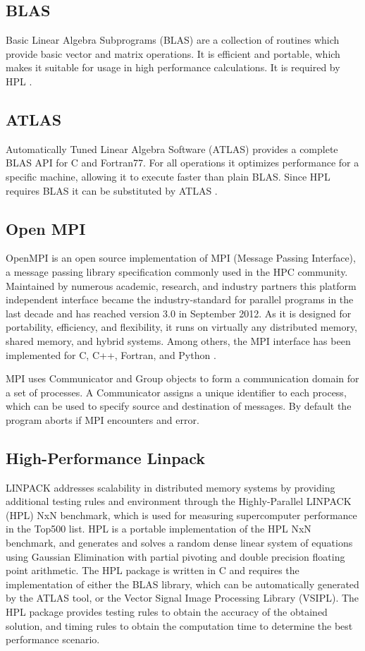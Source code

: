 \documentclass[10pt,twocolumn]{article}
\begin{document}
\subsection{BLAS}
Basic Linear Algebra Subprograms (BLAS) are a collection of routines which provide basic vector and matrix operations. It is efficient and portable, which makes it suitable for usage in high performance calculations. It is required by HPL \cite{blas}.

\subsection{ATLAS}
Automatically Tuned Linear Algebra Software (ATLAS) provides a complete BLAS API for C and Fortran77. For all operations it optimizes performance for a specific machine, allowing it to execute faster than plain BLAS. Since HPL requires BLAS it can be substituted by ATLAS \cite{atlas}.


\subsection{Open MPI}
OpenMPI is an open source implementation of MPI (Message Passing Interface), a message passing library specification commonly used in the HPC community. Maintained by numerous academic, research, and industry partners this platform independent interface became the industry-standard for parallel programs in the last decade and has reached version 3.0 in September 2012. As it is designed for portability, efficiency, and flexibility, it runs on virtually any distributed memory, shared memory, and hybrid systems. Among others, the MPI interface has been implemented for C, C++, Fortran, and Python \cite{mpitut, ompi}.


MPI uses Communicator and Group objects to form a communication domain for a set of processes. A Communicator assigns a unique identifier to each process, which can be used  to specify source and destination of messages. By default the program aborts if MPI encounters and error.

\subsection{High-Performance Linpack}
LINPACK addresses scalability in distributed memory systems by providing additional testing rules and environment through the Highly-Parallel LINPACK (HPL) NxN benchmark, which is used for measuring supercomputer performance in the Top500 list. HPL is a portable implementation of the HPL NxN benchmark, and generates and solves a random dense linear system of equations using Gaussian Elimination with partial pivoting and double precision floating point arithmetic. The HPL package is written in C and requires the implementation of either the BLAS library, which can be automatically generated by the ATLAS tool, or the Vector Signal Image Processing Library (VSIPL). The HPL package provides testing rules to obtain the accuracy of the obtained solution, and timing rules to obtain the computation time to determine the best performance scenario.  
\end{document}

